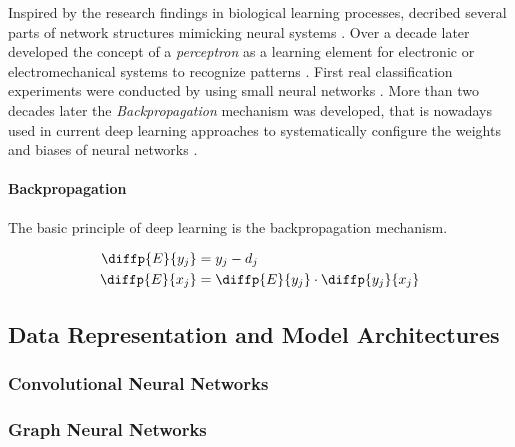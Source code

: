         Inspired by the research findings in biological learning processes, \citeauthor{mcculloch1943logical} decribed several parts of network structures mimicking neural systems \citep{mcculloch1943logical}.
        Over a decade later \citeauthor{rosenblatt1957perceptron} developed the concept of a \emph{perceptron} as a learning element for electronic or electromechanical systems to recognize patterns \citep{rosenblatt1957perceptron}.
        First real classification experiments were conducted by \citeauthor{widrow1960adaptive} using small neural networks \citep{widrow1960adaptive}.
        More than two decades later the \emph{Backpropagation} mechanism was developed, that is nowadays used in current deep learning approaches to systematically configure the weights and biases of neural networks \citep{rumelhart1986learning}.


        \paragraph{Backpropagation} The basic principle of deep learning is the backpropagation mechanism.

        \begin{align}
            \diffp{E}{{y_j}} &= y_j - d_j \\
            \diffp{E}{{x_j}} &= \diffp{E}{{y_j}} \cdot \diffp{{y_j}}{{x_j}}
        \end{align}


    \subsection{Data Representation and Model Architectures} %

        \subsubsection{Convolutional Neural Networks}
        \subsubsection{Graph Neural Networks}

